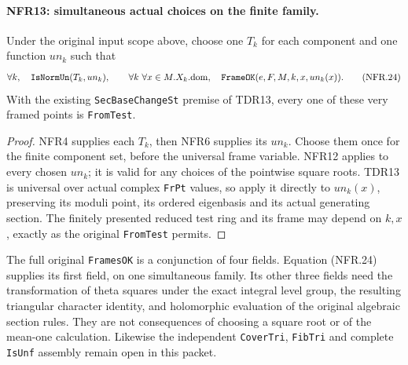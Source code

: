 \documentclass[11pt,a4paper]{article}
\numberwithin{equation}{section}
\theoremstyle{remark}\newtheorem{remark}[theorem]{Remark}
\begin{document}
\paragraph{NFR13: simultaneous actual choices on the finite family.}
\label{claim:NFR13}
Under the original input scope above, choose one $T_k$ for each
component and one function $un_k$ such that
\[
  \forall k,\quad\texttt{Is\allowbreak Norm\allowbreak Un}(T_k,un_k),\qquad
  \forall k\ \forall x\in M.X_k.\mathrm{dom},\quad
                       \texttt{Frame\allowbreak OK}(e,F,M,k,x,un_k(x)).
 \tag{NFR.24}
\]
With the existing \texttt{Sec\allowbreak Base\allowbreak Change\allowbreak St} premise of TDR13,
every one of these very framed points is \texttt{From\allowbreak Test}.

\begin{proof}
NFR4 supplies each $T_k$, then NFR6 supplies its $un_k$.
Choose them once for the finite component set, before the
universal frame variable.  NFR12 applies to every chosen
$un_k$; it is valid for any choices of the pointwise square roots.
TDR13 is universal over actual complex \texttt{Fr\allowbreak Pt} values,
so apply it directly to $un_k(x)$, preserving its moduli point,
its ordered eigenbasis and its actual generating section.
The finitely presented reduced test ring and its frame may depend
on $k,x$, exactly as the original \texttt{From\allowbreak Test} permits.
\end{proof}

The full original \texttt{Frames\allowbreak OK} is a conjunction of four
fields.  Equation (NFR.24) supplies its first field, on one
simultaneous family.  Its other three fields need the
transformation of theta squares under the exact integral
level group, the resulting triangular character identity,
and holomorphic evaluation of the original algebraic section
rules.  They are not consequences of choosing a square root
or of the mean-one calculation.  Likewise the independent
\texttt{Cover\allowbreak Tri}, \texttt{Fib\allowbreak Tri} and complete \texttt{Is\allowbreak Unf}
assembly remain open in this packet.
\end{document}
